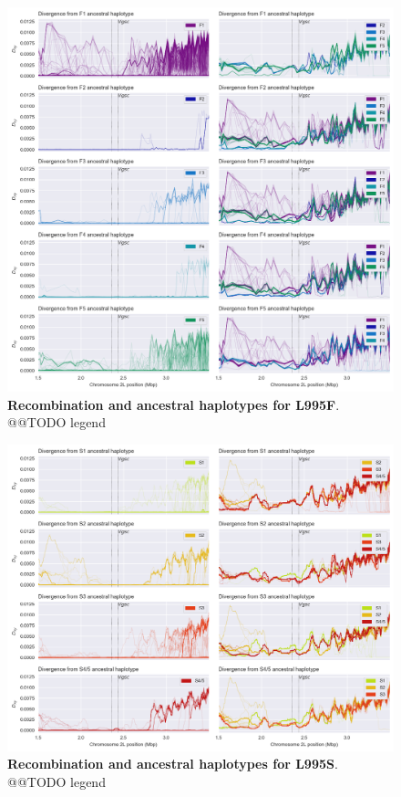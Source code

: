\documentclass[a4paper,11pt,abstracton,hidelinks]{scrartcl}
\begin{document}
%
\begin{figure}[!b]
  \includegraphics[width=1.1\linewidth,center]{artwork/fig_recom_F.png}
  \caption{\textbf{Recombination and ancestral haplotypes for L995F}. @@TODO legend}
  \label{fig:recom_f}
\end{figure}


%
\begin{figure}[!b]
  \includegraphics[width=1.1\linewidth,center]{artwork/fig_recom_S.png}
  \caption{\textbf{Recombination and ancestral haplotypes for L995S}. @@TODO legend}
  \label{fig:recom_s}
\end{figure}
\end{document}

